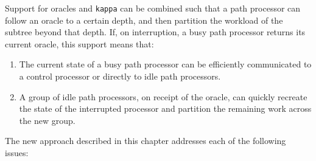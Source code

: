 Support for oracles and \texttt{kappa} can be combined such that a path
processor can follow an oracle to a certain depth, and then partition the
workload of the subtree beyond that depth.  If, on interruption, a busy
path processor returns its current oracle, this support means that:
\begin{enumerate}
\item{The current state of a busy path processor can be efficiently 
  communicated to a control processor or directly to idle path processors.}
\item{A group of idle path processors, on receipt of the oracle, can
  quickly recreate the state of the interrupted processor and partition
  the remaining work across the new group.}
\end{enumerate}

The new approach described in this chapter addresses each of the following issues:
